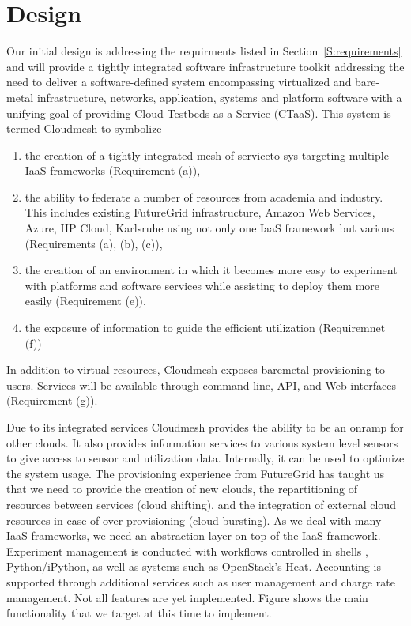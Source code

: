 \documentclass{tex/sig-alternate-2013}
\begin{document}
\section{Design}\label{S:design}

Our initial design is addressing the requirments listed in
Section~\ref{S:requirements} and will provide a
tightly integrated software infrastructure toolkit addressing the need to
deliver a software-defined system encompassing virtualized and
bare-metal infrastructure, networks, application, systems and platform
software with a unifying goal of providing Cloud Testbeds as a Service
(CTaaS). This system is termed Cloudmesh to symbolize

\begin{enumerate}[leftmargin=*,itemsep=0pt,topsep=0pt]

\item the creation of a tightly integrated mesh of serviceto sys targeting
  multiple IaaS frameworks (Requirement (a)), 

\item the ability to federate a number of resources from academia and
  industry. This includes existing FutureGrid infrastructure, Amazon
  Web Services, Azure, HP Cloud, Karlsruhe using not only one IaaS
  framework but various (Requirements (a), (b), (c)),

\item the creation of an environment in which it becomes more easy to
  experiment with platforms and software services while assisting to
  deploy them more easily (Requirement (e)).  

\item the exposure of information to guide the efficient utilization
  (Requiremnet (f))

\end{enumerate}

In addition to virtual resources, Cloudmesh exposes baremetal
provisioning to users. Services will be available through command line,
API, and Web interfaces (Requirement (g)).

Due to its integrated services Cloudmesh provides the ability to be an
onramp for other clouds. It also provides information services to
various system level sensors to give access to sensor and utilization
data. Internally, it can be used to optimize the system usage. The
provisioning experience from FutureGrid has taught us that we need to
provide the creation of new clouds, the repartitioning of resources
between services (cloud shifting), and the integration of external
cloud resources in case of over provisioning (cloud bursting). As we
deal with many IaaS frameworks, we need an abstraction layer on top of
the IaaS framework. Experiment management is conducted with workflows
controlled in shells \cite{cmd3}, Python/iPython, as well as systems
such as OpenStack's Heat. Accounting is supported through additional
services such as user management and charge rate management. Not all
features are yet implemented. Figure \label{F:cm-func} shows the main
functionality that we target at this time to implement.
\end{document}
